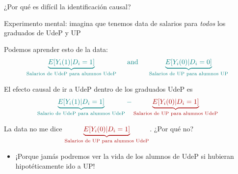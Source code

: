 \documentclass[11pt,handout,aspectratio=169]{beamer}
\newenvironment{wideitemize}{\itemize\addtolength{\itemsep}{10pt}}{\enditemize}
\begin{document}
\begin{frame}{¿Por qué es difícil la identificación causal?}
	
	\begin{wideitemize}
		
		\item
		Experimento mental: imagina que tenemos data de salarios para \textit{todos} los graduados de UdeP y UP		
		
		\item
		Podemos aprender esto de la data:
		$$\color{teal} \underbrace{E[ Y_i(1) | D_i=1  ] }_{\text{Salarios de UdeP para alumnos UdeP}} \hspace{0.5cm}  \text{and} \hspace{0.5cm} \underbrace{E[Y_i(0) | D_i = 0]	}_{\text{Salarios de UP para alumnos UP}}$$
		
		\pause 
		\item
		El efecto causal de ir a UdeP dentro de los graduados UdeP es 
		$$ \color{teal}{\underbrace{E[ Y_i(1) | D_i=1  ] }_{\text{Salario de UdeP para alumnos UdeP}}} - \color{red}{ \underbrace{E[ Y_i(0) | D_i=1  ] }_{\text{Salarios de UP para alumnos UdeP}}}$$ 
		
		\pause 
		\item
		La data no me dice $\color{red}{ \underbrace{E[ Y_i(0) | D_i=1 ] }_{\text{Salarios de UP para alumnos UdeP}}}$. ¿Por qué no? 
		\pause
			\begin{itemize}
				\item 
				¡Porque jamás podremos ver la vida de los alumnos de UdeP si hubieran hipotéticamente ido a UP!
			\end{itemize} 
		
	\end{wideitemize}
	
\end{frame}
\end{document}
